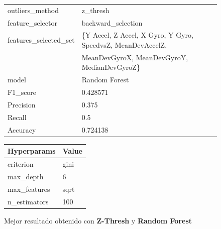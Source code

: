 \begin{appendices}
		\begin{figure}[htb]
			\centering
			\begin{tabular}{ll}
				\toprule
					  outliers\_method &                                           z\_thresh \\
					 feature\_selector &                                 backward\_selection \\
				features\_selected\_set &  \{Y Accel, Z Accel, X Gyro, Y Gyro, SpeedvsZ, MeanDevAccelZ,\\
										& MeanDevGyroX, MeanDevGyroY, MedianDevGyroZ\}\\
								model &                                      Random Forest \\
							 F1\_score &                                           0.428571 \\
							Precision &                                              0.375 \\
							   Recall &                                                0.5 \\
							 Accuracy &                                           0.724138 \\
				\bottomrule
			\end{tabular}
			\newline
			\newline
			
			\begin{tabular}{ll}
				\toprule
				 Hyperparams & Value \\
				\midrule
				   criterion &  gini \\
				   max\_depth &     6 \\
				max\_features &  sqrt \\
				n\_estimators &   100 \\
				\bottomrule
			\end{tabular}
			\caption{Mejor resultado obtenido con \textbf{Z-Thresh} y \textbf{Random Forest}}
			\label{table:30}
		\end{figure}
		
		\begin{figure}[htb]
			\centering


\end{figure}
\end{appendices}
